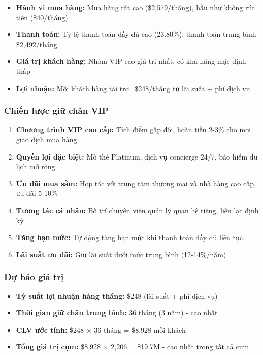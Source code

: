 \begin{itemize}
    \item \textbf{Hành vi mua hàng:} Mua hàng rất cao (\$2,579/tháng), hầu như không rút tiền (\$40/tháng)
    \item \textbf{Thanh toán:} Tỷ lệ thanh toán đầy đủ cao (23.80\%), thanh toán trung bình \$2,492/tháng
    \item \textbf{Giá trị khách hàng:} Nhóm VIP cao giá trị nhất, có khả năng mặc định thấp
    \item \textbf{Lợi nhuận:} Mỗi khách hàng tài trợ ~\$248/tháng từ lãi suất + phí dịch vụ
\end{itemize}

\subsubsection{Chiến lược giữ chân VIP}

\begin{enumerate}
    \item \textbf{Chương trình VIP cao cấp:} Tích điểm gấp đôi, hoàn tiền 2-3\% cho mọi giao dịch mua hàng
    \item \textbf{Quyền lợi đặc biệt:} Mở thẻ Platinum, dịch vụ concierge 24/7, bảo hiểm du lịch mở rộng
    \item \textbf{Ưu đãi mua sắm:} Hợp tác với trung tâm thương mại và nhà hàng cao cấp, ưu đãi 5-10\%
    \item \textbf{Tương tác cá nhân:} Bố trí chuyên viên quản lý quan hệ riêng, liên lạc định kỳ
    \item \textbf{Tăng hạn mức:} Tự động tăng hạn mức khi thanh toán đầy đủ liên tục
    \item \textbf{Lãi suất ưu đãi:} Giữ lãi suất dưới mức trung bình (12-14\%/năm)
\end{enumerate}

\subsubsection{Dự báo giá trị}

\begin{itemize}
    \item \textbf{Tỷ suất lợi nhuận hàng tháng:} \$248 (lãi suất + phí dịch vụ)
    \item \textbf{Thời gian giữ chân trung bình:} 36 tháng (3 năm) - cao nhất
    \item \textbf{CLV ước tính:} \$248 × 36 tháng = \$8,928 mỗi khách
    \item \textbf{Tổng giá trị cụm:} \$8,928 × 2,206 = \$19.7M - cao nhất trong tất cả cụm
\end{itemize}

